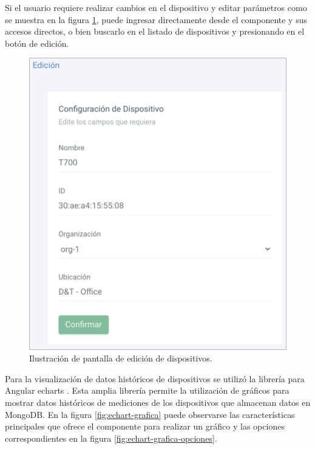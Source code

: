 Si el usuario requiere realizar cambios en el dispositivo y editar parámetros como se muestra en la figura \ref{fig:edicion-dev}, puede ingresar directamente desde el componente y sus accesos directos, o bien buscarlo en el listado de dispositivos y presionando en el botón de edición.
\pagebreak
 \begin{figure}[htpb]
	\centering
	\includegraphics[scale=.55]{./Figures/edicion-dev.png}
	\caption[Pantalla de edición de dispositivos]{Ilustración de pantalla de edición de dispositivos.}
	\label{fig:edicion-dev}
\end{figure}


Para la visualización de datos históricos de dispositivos se utilizó la librería para Angular echarts \citep{WEBSITE:43}. Esta amplia librería permite la utilización de gráficos para mostrar datos históricos de mediciones de los dispositivos que almacenan datos en MongoDB. En la figura \ref{fig:echart-grafica} puede observarse las características principales que ofrece el componente para realizar un gráfico y las opciones correspondientes en la figura \ref{fig:echart-grafica-opciones}.


